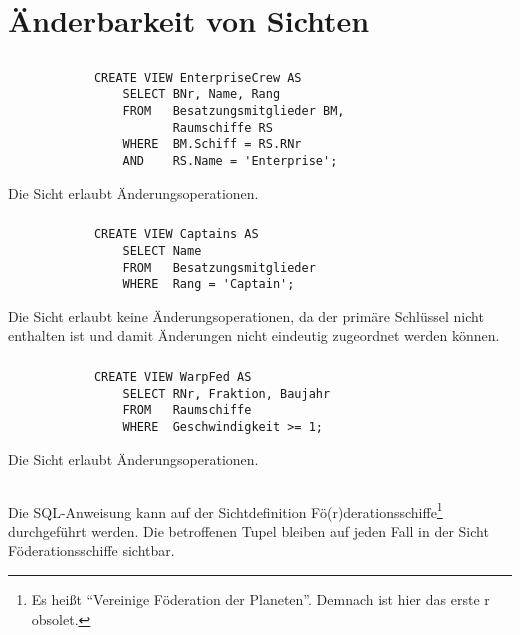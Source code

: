 \documentclass[ngerman]{gdb-aufgabenblatt}
\begin{document}
	\subsection{} %
		
	\subsection{} %
\section{Änderbarkeit von Sichten}
	\subsection{} %
		\subsubsection{} %
			\begin{verbatim}
			CREATE VIEW EnterpriseCrew AS
			    SELECT BNr, Name, Rang
			    FROM   Besatzungsmitglieder BM,
			           Raumschiffe RS
			    WHERE  BM.Schiff = RS.RNr
			    AND    RS.Name = 'Enterprise';
			\end{verbatim}
			Die Sicht erlaubt Änderungsoperationen.
		\subsubsection{} %
			\begin{verbatim}
			CREATE VIEW Captains AS
			    SELECT Name
			    FROM   Besatzungsmitglieder
			    WHERE  Rang = 'Captain';
			\end{verbatim}
			Die Sicht erlaubt keine Änderungsoperationen, da der primäre Schlüssel nicht enthalten ist und damit Änderungen nicht eindeutig zugeordnet werden können.
		\subsubsection{} %
			\begin{verbatim}
			CREATE VIEW WarpFed AS
			    SELECT RNr, Fraktion, Baujahr
			    FROM   Raumschiffe
			    WHERE  Geschwindigkeit >= 1;
			\end{verbatim}
			Die Sicht erlaubt Änderungsoperationen.
	\subsection{} %
		\subsubsection{} %
			Die SQL-Anweisung kann auf der Sichtdefinition Fö(r)derationsschiffe\footnote{Es heißt "`Vereinige Föderation der Planeten"'. Demnach ist hier das erste r obsolet.} durchgeführt werden. Die betroffenen Tupel bleiben auf jeden Fall in der Sicht Föderationsschiffe sichtbar.
\end{document}
